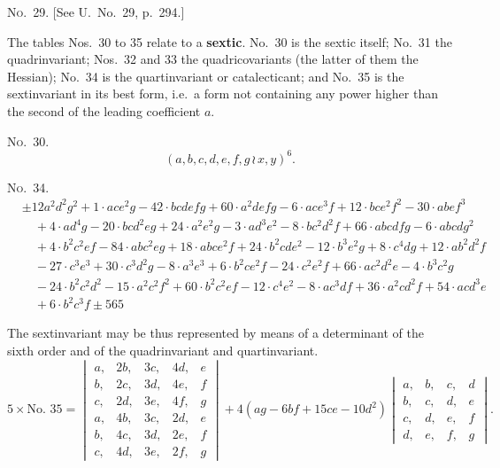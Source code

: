\documentclass[11pt,a4paper]{article}
\begin{document}
\noindent\textsc{No.~29.} [See U.\ No.~29, p.~294.]

The tables Nos.~30 to 35 relate to a \textbf{sextic}.
No.~30 is the sextic itself; No.~31 the quadrinvariant; Nos.~32 and 33 the quadricovariants
(the latter of them the Hessian); No.~34 is the quartinvariant or catalecticant;
and No.~35 is the sextinvariant in its best form, i.e.\ a form not containing any
power higher than the second of the leading coefficient $a$.

\noindent\textsc{No.~30.}
\[(a, b, c, d, e, f, g \, \wr\, x, y)^6.\]

\noindent\textsc{No.~34.}
\begin{align*}
&\pm 12 a^2d^2g^2 + 1\cdot ace^2g - 42\cdot bcdefg + 60\cdot a^2defg - 6\cdot ace^3f + 12\cdot bce^2f^2 - 30\cdot abef^3\\
&\quad + 4\cdot ad^4g - 20\cdot bcd^2eg + 24\cdot a^2e^2g - 3\cdot ad^3e^2 - 8\cdot bc^2d^2f + 66\cdot abcdfg - 6\cdot abcdg^2\\
&\quad + 4\cdot b^2c^2ef - 84\cdot abc^2eg + 18\cdot abce^2f + 24\cdot b^2cde^2 - 12\cdot b^3e^2g + 8\cdot c^4dg + 12\cdot ab^2d^2f\\
&\quad - 27\cdot c^3e^3 + 30\cdot c^3d^2g - 8\cdot a^3e^3 + 6\cdot b^2ce^2f - 24\cdot c^2e^2f + 66\cdot ac^2d^2e - 4\cdot b^3c^2g\\
&\quad - 24\cdot b^2c^2d^2 - 15\cdot a^2c^2f^2 + 60\cdot b^2c^2ef - 12\cdot c^4e^2 - 8\cdot ac^3df + 36\cdot a^2cd^2f + 54\cdot acd^3e\\
&\quad + 6\cdot b^2c^3f \pm 565
\end{align*}

The sextinvariant may be thus represented by means of a determinant of the
sixth order and of the quadrinvariant and quartinvariant.
\[5 \times \text{No.~35} =
\begin{vmatrix}
a, & 2b, & 3c, & 4d, & e \\
b, & 2c, & 3d, & 4e, & f \\
c, & 2d, & 3e, & 4f, & g \\
a, & 4b, & 3c, & 2d, & e \\
b, & 4c, & 3d, & 2e, & f \\
c, & 4d, & 3e, & 2f, & g
\end{vmatrix}
+ 4(ag - 6bf + 15ce - 10d^2)
\begin{vmatrix}
a, & b, & c, & d \\
b, & c, & d, & e \\
c, & d, & e, & f \\
d, & e, & f, & g
\end{vmatrix}.\]
\end{document}
